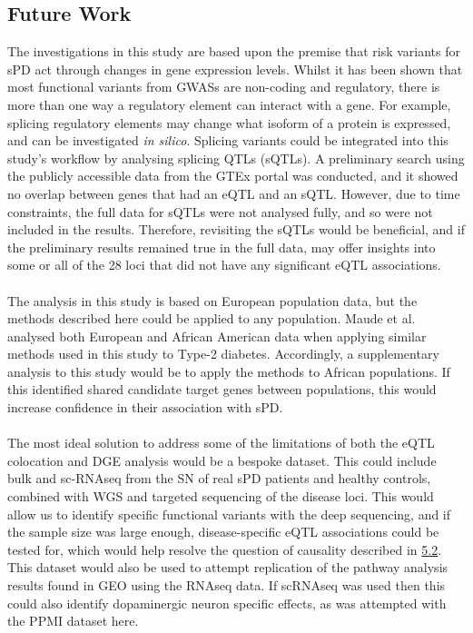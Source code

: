 \documentclass{article}
\begin{document}
\subsection{Future Work}
The investigations in this study are based upon the premise that risk variants for sPD act through changes in gene expression levels. Whilst it has been shown that most functional variants from GWASs are non-coding and regulatory\cite{Maurano2012SystematicDNA}, there is more than one way a regulatory element can interact with a gene. For example, splicing regulatory elements may change what isoform of a protein is expressed, and can be investigated \textit{in silico}\cite{Tubeuf2020LargescaleElements}. Splicing variants could be integrated into this study's workflow by analysing splicing QTLs (sQTLs). A preliminary search using the publicly accessible data from the GTEx portal\cite{Aguet2020TheTissues} was conducted, and it showed no overlap between genes that had an eQTL and an sQTL. However, due to time constraints, the full data for sQTLs were not analysed fully, and so were not included in the results. Therefore, revisiting the sQTLs would be beneficial, and if the preliminary results remained true in the full data, may offer insights into some or all of the 28 loci that did not have any significant eQTL associations.
\\
\\The analysis in this study is based on European population data, but the methods described here could be applied to any population. Maude et al.\cite{Maude2021NewDiabetes.} analysed both European and African American data when applying similar methods used in this study to Type-2 diabetes. Accordingly, a supplementary analysis to this study would be to apply the methods to African populations. If this identified shared candidate target genes between populations, this would increase confidence in their association with sPD. 
\\
\\The most ideal solution to address some of the limitations of both the eQTL colocation and DGE analysis would be a bespoke dataset. This could include bulk and sc-RNAseq from the SN of real sPD patients and healthy controls, combined with WGS and targeted sequencing of the disease loci. This would allow us to identify specific functional variants with the deep sequencing, and if the sample size was large enough, disease-specific eQTL associations could be tested for, which would help resolve the question of causality described in \hyperref[subsubsec:causality]{5.2}. This dataset would also be used to attempt replication of the pathway analysis results found in GEO using the RNAseq data. If scRNAseq was used then this could also identify dopaminergic neuron specific effects, as was attempted with the PPMI dataset here. 
\end{document}
